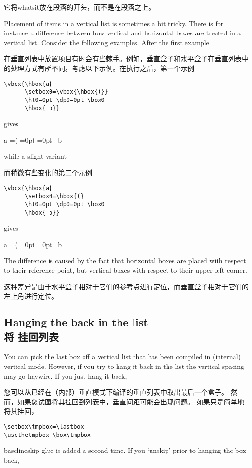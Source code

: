 它将whatsit放在段落的开头，而不是在段落之上。

Placement of items in a vertical list is sometimes
a bit tricky. There is for instance a difference between
how vertical and horizontal boxes are treated in a
vertical list. Consider the following examples.
After  the first example

在垂直列表中放置项目有时会有些棘手。例如，垂直盒子和水平盒子在垂直列表中的处理方式有所不同。考虑以下示例。在执行之后，第一个示例
\begin{verbatim}
\vbox{\hbox{a}
      \setbox0=\vbox{\hbox{(}}
      \ht0=0pt \dp0=0pt \box0
      \hbox{ b}}
\end{verbatim}
gives \begin{disp}\offinterlineskip\leavevmode\vbox{\hbox{a}
      =\vbox{\hbox{(}}
      =0pt =0pt 
      \hbox{ b}}
\end{disp}
while a slight variant

而稍微有些变化的第二个示例
\begin{verbatim}
\vbox{\hbox{a}
      \setbox0=\hbox{(}
      \ht0=0pt \dp0=0pt \box0
      \hbox{ b}}
\end{verbatim}
\awp 
gives
\begin{disp}\offinterlineskip\leavevmode\vbox{\hbox{a}
      =\hbox{(}
      =0pt =0pt
      \hbox{ b}}
\end{disp}
The difference is caused by the fact that horizontal boxes
are placed with respect to their reference point, but vertical
boxes with respect to their upper left corner.

这种差异是由于水平盒子相对于它们的参考点进行定位，而垂直盒子相对于它们的左上角进行定位。



\subsection{Hanging the  back in the list\\将  挂回列表}

You can pick the last box off a vertical list that has been
compiled in (internal) vertical mode.
However, if you try to hang it back in the list the vertical
spacing may go haywire. If you just hang it back, 

您可以从已经在（内部）垂直模式下编译的垂直列表中取出最后一个盒子。
然而，如果您试图将其挂回到列表中，垂直间距可能会出现问题。
如果只是简单地将其挂回，
\begin{verbatim}
\setbox\tmpbox=\lastbox
\usethetmpbox \box\tmpbox
\end{verbatim}
baselineskip glue is added a second time. If you `unskip' prior
to hanging the box back, 

